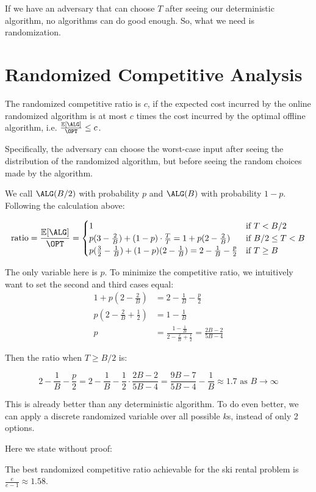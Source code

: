 If we have an adversary that can choose $T$ after seeing our deterministic algorithm, no algorithms can do good enough. So, what we need is randomization.

\section{Randomized Competitive Analysis}

\begin{definition}
  The randomized competitive ratio is $c$, if the expected cost incurred by the online randomized algorithm is at most $c$ times the cost incurred by the optimal offline algorithm, i.e. $\frac{\mathbb{E}[\ALG]}{\OPT} \leq c$.

  Specifically, the adversary can choose the worst-case input after seeing the distribution of the randomized algorithm, but before seeing the random choices made by the algorithm.
\end{definition}

\begin{eg}
  We call $\ALG(B/2)$ with probability $p$ and $\ALG(B)$ with probability $1-p$. Following the calculation above:

  \[ \text{ratio} = \frac{\mathbb{E}[\ALG]}{\OPT} = \begin{cases}
    1 & \text{if } T < B/2 \\
    p(3 - \frac{2}{B}) + (1-p) \cdot \frac{T}{T} = 1 + p(2 - \frac{2}{B}) & \text{if } B/2 \leq T < B \\
    p(\frac{3}{2} - \frac{1}{B}) + (1-p)(2 - \frac{1}{B}) = 2 - \frac{1}{B} - \frac{p}{2} & \text{if } T \geq B
  \end{cases} \]

  The only variable here is $p$. To minimize the competitive ratio, we intuitively want to set the second and third cases equal:
  \begin{align*}
    1 + p(2 - \frac{2}{B}) &= 2 - \frac{1}{B} - \frac{p}{2} \\
    p(2 - \frac{2}{B} + \frac{1}{2}) &= 1 - \frac{1}{B} \\
    p &= \frac{1 - \frac{1}{B}}{2 - \frac{2}{B} + \frac{1}{2}} = \frac{2B - 2}{5 B - 4}
  \end{align*}

  Then the ratio when $T \geq B/2$ is:

  \[
    2 - \frac{1}{B} - \frac{p}{2} = 2 - \frac{1}{B} - \frac{1}{2} \cdot \frac{2B - 2}{5 B - 4} = \frac{9B-7}{5B-4} - \frac{1}{B} \approx 1.7 \text{ as } B \rightarrow \infty
  \]
\end{eg}

This is already better than any deterministic algorithm. To do even better, we can apply a discrete randomized variable over all possible $k$s, instead of only 2 options.

Here we state without proof:

\begin{theorem}
  The best randomized competitive ratio achievable for the ski rental problem is $\frac{e}{e-1} \approx 1.58$.
\end{theorem}
